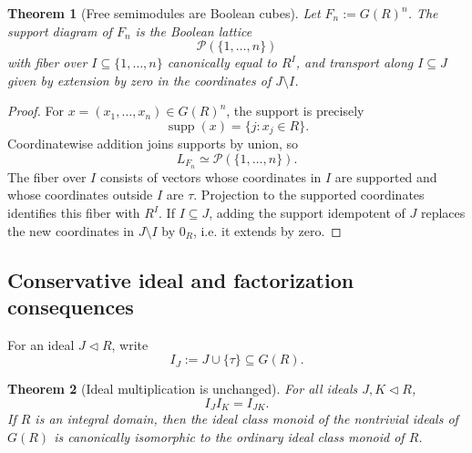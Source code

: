 \documentclass[11pt]{article}
\newcommand{\supp}{\operatorname{supp}}
\newcommand{\Part}{\mathcal P}
\newcommand{\1}{\mathbf 1}
\newtheorem{theorem}{Theorem}[section]
\numberwithin{equation}{section}
\begin{document}
\begin{theorem}[Free semimodules are Boolean cubes]\label{thm:free-boolean-cube}
Let $F_n:=G(R)^n$.  The support diagram of $F_n$ is the Boolean lattice
\begin{equation}
  \Part(\{1,\dots,n\})
\end{equation}
with fiber over $I\subseteq\{1,
\dots,n\}$ canonically equal to $R^I$, and transport along $I\subseteq J$ given by extension by zero in the coordinates of $J\setminus I$.
\end{theorem}

\begin{proof}
For $x=(x_1,\dots,x_n)\in G(R)^n$, the support is precisely
\begin{equation}
  \supp(x)=\{j:x_j\in R\}.
\end{equation}
Coordinatewise addition joins supports by union, so
\begin{equation}
  L_{F_n}\simeq\Part(\{1,\dots,n\}).
\end{equation}
The fiber over $I$ consists of vectors whose coordinates in $I$ are supported and whose coordinates outside $I$ are $\tau$.  Projection to the supported coordinates identifies this fiber with $R^I$.  If $I\subseteq J$, adding the support idempotent of $J$ replaces the new coordinates in $J\setminus I$ by $0_R$, i.e. it extends by zero.
\end{proof}

\subsection{Conservative ideal and factorization consequences}

For an ideal $J\triangleleft R$, write
\begin{equation}
  I_J:=J\cup\{\tau\}\subseteq G(R).
\end{equation}

\begin{theorem}[Ideal multiplication is unchanged]\label{thm:ideal-mult}
For all ideals $J,K\triangleleft R$,
\begin{equation}
  I_J I_K=I_{JK}.
\end{equation}
If $R$ is an integral domain, then the ideal class monoid of the nontrivial ideals of $G(R)$ is canonically isomorphic to the ordinary ideal class monoid of $R$.
\end{theorem}
\end{document}
